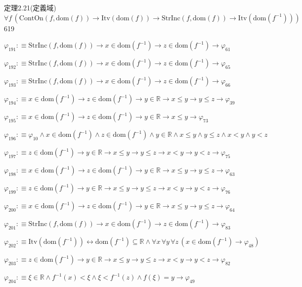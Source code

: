 \begin{fullproof}{定理2.21(定義域)}{$\forall f\,(\mathrm{ContOn}(f,\mathrm{dom}(f)) \to \mathrm{Itv}(\mathrm{dom}(f)) \to \mathrm{StrInc}(f,\mathrm{dom}(f)) \to \mathrm{Itv}(\mathrm{dom}(f^{-1})))$}{619}
\begin{abbrevlist}
\item $\varphi_{191} :\equiv \mathrm{StrInc}(f,\mathrm{dom}(f)) \to x \in \mathrm{dom}(f^{-1}) \to z \in \mathrm{dom}(f^{-1}) \to \varphi_{61}$
\item $\varphi_{192} :\equiv \mathrm{StrInc}(f,\mathrm{dom}(f)) \to x \in \mathrm{dom}(f^{-1}) \to z \in \mathrm{dom}(f^{-1}) \to \varphi_{65}$
\item $\varphi_{193} :\equiv \mathrm{StrInc}(f,\mathrm{dom}(f)) \to x \in \mathrm{dom}(f^{-1}) \to z \in \mathrm{dom}(f^{-1}) \to \varphi_{66}$
\item $\varphi_{194} :\equiv x \in \mathrm{dom}(f^{-1}) \to z \in \mathrm{dom}(f^{-1}) \to y \in \mathbb{R} \to x \leq y \to y \leq z \to \varphi_{39}$
\item $\varphi_{195} :\equiv x \in \mathrm{dom}(f^{-1}) \to z \in \mathrm{dom}(f^{-1}) \to y \in \mathbb{R} \to x \leq y \to \varphi_{73}$
\item $\varphi_{196} :\equiv \varphi_{10} \land x \in \mathrm{dom}(f^{-1}) \land z \in \mathrm{dom}(f^{-1}) \land y \in \mathbb{R} \land x \leq y \land y \leq z \land x < y \land y < z$
\item $\varphi_{197} :\equiv z \in \mathrm{dom}(f^{-1}) \to y \in \mathbb{R} \to x \leq y \to y \leq z \to x < y \to y < z \to \varphi_{75}$
\item $\varphi_{198} :\equiv x \in \mathrm{dom}(f^{-1}) \to z \in \mathrm{dom}(f^{-1}) \to y \in \mathbb{R} \to x \leq y \to y \leq z \to \varphi_{63}$
\item $\varphi_{199} :\equiv z \in \mathrm{dom}(f^{-1}) \to y \in \mathbb{R} \to x \leq y \to y \leq z \to x < y \to y < z \to \varphi_{76}$
\item $\varphi_{200} :\equiv x \in \mathrm{dom}(f^{-1}) \to z \in \mathrm{dom}(f^{-1}) \to y \in \mathbb{R} \to x \leq y \to y \leq z \to \varphi_{64}$
\item $\varphi_{201} :\equiv \mathrm{StrInc}(f,\mathrm{dom}(f)) \to x \in \mathrm{dom}(f^{-1}) \to z \in \mathrm{dom}(f^{-1}) \to \varphi_{83}$
\item $\varphi_{202} :\equiv \mathrm{Itv}(\mathrm{dom}(f^{-1})) \leftrightarrow \mathrm{dom}(f^{-1}) \subseteq \mathbb{R} \land \forall x\,\forall y\,\forall z\,(x \in \mathrm{dom}(f^{-1}) \to \varphi_{48})$
\item $\varphi_{203} :\equiv z \in \mathrm{dom}(f^{-1}) \to y \in \mathbb{R} \to x \leq y \to y \leq z \to x < y \to y < z \to \varphi_{82}$
\item $\varphi_{204} :\equiv \xi \in \mathbb{R} \land f^{-1}(x) < \xi \land \xi < f^{-1}(z) \land f(\xi) = y \to \varphi_{49}$

\end{abbrevlist}
\end{fullproof}
